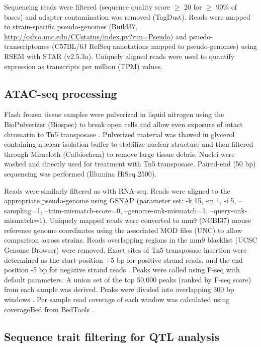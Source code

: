 \documentclass[10pt,letterpaper]{article}
\begin{document}
Sequencing reads were filtered (sequence quality score $\ge$ 20 for $\ge$ 90\% of bases) and adapter contamination was removed (TagDust). Reads were mapped to strain-specific pseudo-genomes (Build37, \url{http://csbio.unc.edu/CCstatus/index.py?run=Pseudo}) and psuedo-transcriptomes (C57BL/6J RefSeq annotations mapped to pseudo-genomes) using RSEM with STAR (v2.5.3a). Uniquely aligned reads were used to quantify expression as transcripts per million (TPM) values.

\subsection*{ATAC-seq processing}

Flash frozen tissue samples were pulverized in liquid nitrogen using the BioPulverizer (Biospec) to break open cells and allow even exposure of intact chromatin to Tn5 transposase \cite{Buenrostro2015}. Pulverized material was thawed in glycerol containing nuclear isolation buffer to stabilize nuclear structure and then filtered through Miracloth (Calbiochem) to remove large tissue debris. Nuclei were washed and directly used for treatment with Tn5 transposase. Paired-end (50 bp) sequencing was performed (Illumina HiSeq 2500).

Reads were similarly filtered as with RNA-seq. Reads were aligned to the appropriate pseudo-genome using GSNAP (parameter set: -k 15, -m 1, -i 5, –sampling=1, –trim-mismatch-score=0, –genome-unk-mismatch=1, –query-unk-mismatch=1). Uniquely mapped reads were converted to mm9 (NCBI37) mouse reference genome coordinates using the associated MOD files (UNC) to allow comparison across strains. Reads overlapping regions in the mm9 blacklist (UCSC Genome Browser) were removed. Exact sites of Tn5 transposase insertion were determined as the start position +5 bp for positive strand reads, and the end position -5 bp for negative strand reads \cite{Buenrostro2013}. Peaks were called using F-seq with default parameters. A union set of the top 50,000 peaks (ranked by F-seq score) from each sample was derived. Peaks were divided into overlapping 300 bp windows \cite{Shibata2012}. Per sample read coverage of each window was calculated using coverageBed from BedTools \cite{Quinlan2010}.

\subsection*{Sequence trait filtering for QTL analysis}
\end{document}
